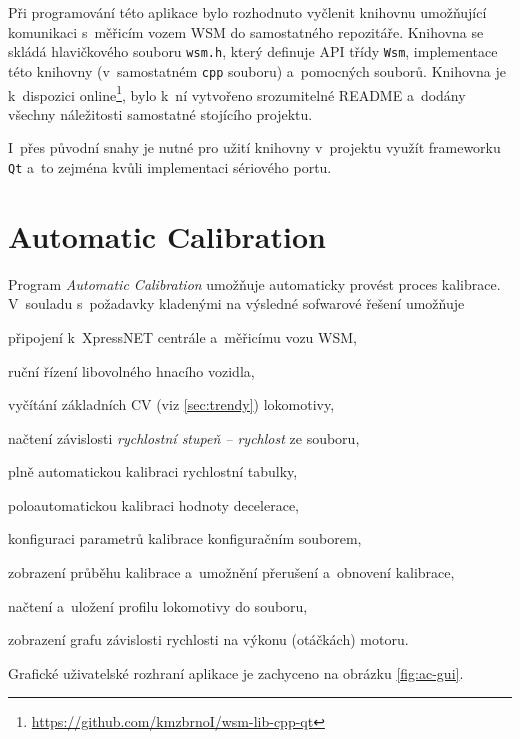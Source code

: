 Při programování této aplikace bylo rozhodnuto vyčlenit knihovnu umožňující
komunikaci s~měřicím vozem WSM do samostatného repozitáře. Knihovna se skládá
hlavičkového souboru \texttt{wsm.h}, který definuje API třídy \texttt{Wsm},
implementace této knihovny (v~samostatném \texttt{cpp} souboru) a~pomocných
souborů. Knihovna je k~dispozici
online\footnote{\url{https://github.com/kmzbrnoI/wsm-lib-cpp-qt}}, bylo k~ní
vytvořeno srozumitelné README a~dodány všechny náležitosti samostatné stojícího
projektu.

I~přes původní snahy je nutné pro užití knihovny v~projektu využít frameworku
\texttt{Qt} a~to zejména kvůli implementaci sériového portu.


\newpage
\section{Automatic Calibration}
\label{sec:sw-wsm-auto-calib}

Program \textit{Automatic Calibration} umožňuje automaticky provést proces
kalibrace. V~souladu s~požadavky kladenými na výsledné sofwarové řešení
umožňuje

\begin{compactitem}
\item připojení k~XpressNET centrále a~měřicímu vozu WSM,
\item ruční řízení libovolného hnacího vozidla,
\item vyčítání základních CV (viz \ref{sec:trendy}) lokomotivy,
\item načtení závislosti \textit{rychlostní stupeň -- rychlost} ze souboru,
\item plně automatickou kalibraci rychlostní tabulky,
\item poloautomatickou kalibraci hodnoty decelerace,
\item konfiguraci parametrů kalibrace konfiguračním souborem,
\item zobrazení průběhu kalibrace a~umožnění přerušení a~obnovení kalibrace,
\item načtení a~uložení profilu lokomotivy do souboru,
\item zobrazení grafu závislosti rychlosti na výkonu (otáčkách) motoru.
\end{compactitem}

Grafické uživatelské rozhraní aplikace je zachyceno na obrázku \ref{fig:ac-gui}.

